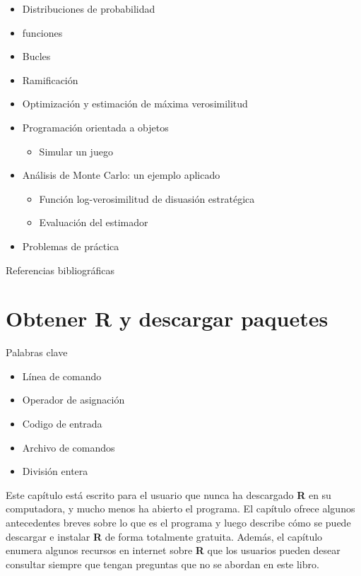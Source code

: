 \documentclass[
]{book}
\providecommand{\tightlist}{%
  \setlength{\itemsep}{0pt}\setlength{\parskip}{0pt}}
\begin{document}
\begin{itemize}
\tightlist
\item
  Distribuciones de probabilidad
\item
  funciones
\item
  Bucles
\item
  Ramificación
\item
  Optimización y estimación de máxima verosimilitud
\item
  Programación orientada a objetos

  \begin{itemize}
  \tightlist
  \item
    Simular un juego
  \end{itemize}
\item
  Análisis de Monte Carlo: un ejemplo aplicado

  \begin{itemize}
  \tightlist
  \item
    Función log-verosimilitud de disuasión estratégica
  \item
    Evaluación del estimador
  \end{itemize}
\item
  Problemas de práctica
\end{itemize}

Referencias bibliográficas

\hypertarget{Capuxedtulo1}{%
\chapter{Obtener R y descargar paquetes}\label{Capuxedtulo1}}

Palabras clave

\begin{itemize}
\tightlist
\item
  Línea de comando
\item
  Operador de asignación
\item
  Codigo de entrada
\item
  Archivo de comandos
\item
  División entera
\end{itemize}

Este capítulo está escrito para el usuario que nunca ha descargado \textbf{R} en su computadora, y mucho menos ha abierto el programa. El capítulo ofrece algunos antecedentes breves sobre lo que es el programa y luego describe cómo se puede descargar e instalar \textbf{R} de forma totalmente gratuita. Además, el capítulo enumera algunos recursos en internet sobre \textbf{R} que los usuarios pueden desear consultar siempre que tengan preguntas que no se abordan en este libro.
\end{document}

